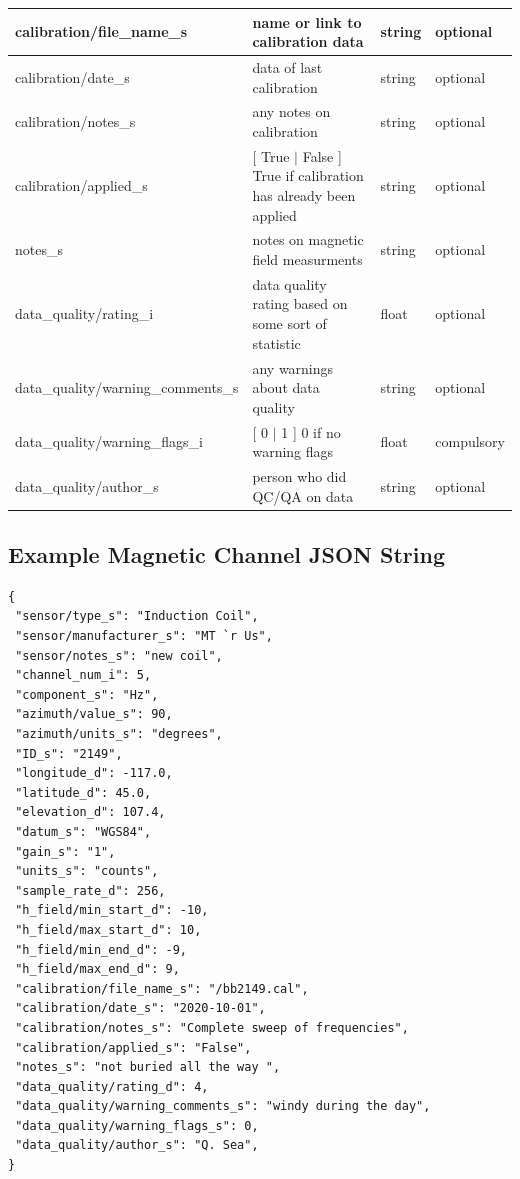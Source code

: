 \documentclass{article}
\begin{document}
\begin{table}[htb!]
\begin{tabular}{|l|p{3in}|l|l|}
		calibration/file\_name\_s & name or link to calibration data & string &  optional \\ \hline
		calibration/date\_s & data of last calibration & string &  optional \\ \hline
		calibration/notes\_s & any notes on calibration & string &  optional \\ \hline
		calibration/applied\_s & [ True $|$ False ] True if calibration has already been applied & string & optional \\ \hline
		notes\_s & notes on magnetic field measurments & string & optional \\ \hline
		data\_quality/rating\_i & data quality rating based on some sort of statistic & float &  optional\\ \hline
		data\_quality/warning\_comments\_s & any warnings about data quality & string & optional \\ \hline
		data\_quality/warning\_flags\_i & [ 0 $|$ 1 ] 0 if no warning flags  & float &  compulsory \\ \hline
		data\_quality/author\_s & person who did QC/QA on data & string & optional \\ \hline
		\end{tabular}
	\label{tab:magnetic}
\end{table}

\newpage
\subsection{Example Magnetic Channel JSON String}

\begin{verbatim}
{
 "sensor/type_s": "Induction Coil",
 "sensor/manufacturer_s": "MT `r Us",
 "sensor/notes_s": "new coil",
 "channel_num_i": 5,
 "component_s": "Hz",
 "azimuth/value_s": 90,
 "azimuth/units_s": "degrees",
 "ID_s": "2149",
 "longitude_d": -117.0,
 "latitude_d": 45.0,
 "elevation_d": 107.4,
 "datum_s": "WGS84",
 "gain_s": "1",
 "units_s": "counts",
 "sample_rate_d": 256,
 "h_field/min_start_d": -10,
 "h_field/max_start_d": 10,
 "h_field/min_end_d": -9,
 "h_field/max_end_d": 9,
 "calibration/file_name_s": "/bb2149.cal",
 "calibration/date_s": "2020-10-01",
 "calibration/notes_s": "Complete sweep of frequencies",
 "calibration/applied_s": "False",
 "notes_s": "not buried all the way ",
 "data_quality/rating_d": 4,
 "data_quality/warning_comments_s": "windy during the day",
 "data_quality/warning_flags_s": 0,
 "data_quality/author_s": "Q. Sea",
}
\end{verbatim}
\end{document}
